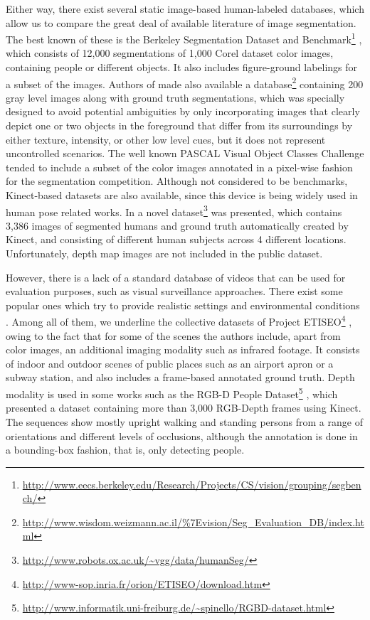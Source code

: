 \documentclass[10pt,twocolumn,letterpaper]{article}
\begin{document}
Either way, there exist several static image-based human-labeled databases, which allow us to compare the great deal of available literature of image segmentation. The best known of these is the Berkeley Segmentation Dataset and Benchmark\footnote{\url{http://www.eecs.berkeley.edu/Research/Projects/CS/vision/grouping/segbench/}} \cite{martin2001database}, which consists of 12,000 segmentations of 1,000 Corel dataset color images, containing people or different objects. It also includes figure-ground labelings for a subset of the images. Authors of \cite{alpert2007} made also available a database\footnote{\url{http://www.wisdom.weizmann.ac.il/\%7Evision/Seg_Evaluation_DB/index.html}} containing 200 gray level images along with ground truth segmentations, which was specially designed to avoid potential ambiguities by only incorporating images that clearly depict one or two objects in the foreground that differ from its surroundings by either texture, intensity, or other low level cues, but it does not represent uncontrolled scenarios. The well known PASCAL Visual Object Classes Challenge \cite{everingham2012pascal} tended to include a subset of the color images annotated in a pixel-wise fashion for the segmentation competition. Although not considered to be benchmarks, Kinect-based datasets are also available, since this device is being widely used in human pose related works. In \cite{gulshan2011humanising} a novel dataset\footnote{\url{http://www.robots.ox.ac.uk/~vgg/data/humanSeg/}} was presented, which contains 3,386 images of segmented humans and ground truth automatically created by Kinect, and consisting of different human subjects across 4 different locations. Unfortunately, depth map images are not included in the public dataset. 

However, there is a lack of a standard database of videos that can be used for evaluation purposes, such as visual surveillance approaches. There exist some popular ones which try to provide realistic settings and environmental conditions \cite{moeslund2011visual}. Among all of them, we underline the collective datasets of Project ETISEO\footnote{\url{http://www-sop.inria.fr/orion/ETISEO/download.htm}} \cite{nghiem2007etiseo}, owing to the fact that for some of the scenes the authors include, apart from color images, an additional imaging modality such as infrared footage. It consists of indoor and outdoor scenes of public places such as an airport apron or a subway station, and also includes a frame-based annotated ground truth. Depth modality is used in some works such as the RGB-D People Dataset\footnote{\url{http://www.informatik.uni-freiburg.de/~spinello/RGBD-dataset.html}} \cite{spinello2011people}, which presented a dataset containing more than 3,000 RGB-Depth frames using Kinect. The sequences show mostly upright walking and standing persons from a range of orientations and different levels of occlusions, although the annotation is done in a bounding-box fashion, that is, only detecting people.
\end{document}
